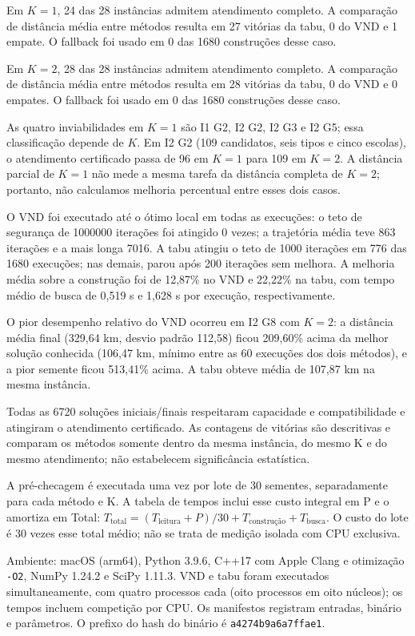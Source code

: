 Em $K=1$, 24 das 28 instâncias admitem atendimento completo. A comparação de distância média entre métodos resulta em 27 vitórias da tabu, 0 do VND e 1 empate. O fallback foi usado em 0 das 1680 construções desse caso.

Em $K=2$, 28 das 28 instâncias admitem atendimento completo. A comparação de distância média entre métodos resulta em 28 vitórias da tabu, 0 do VND e 0 empates. O fallback foi usado em 0 das 1680 construções desse caso.

As quatro inviabilidades em $K=1$ são I1 G2, I2 G2, I2 G3 e I2 G5; essa classificação depende de $K$. Em I2 G2 (109 candidatos, seis tipos e cinco escolas), o atendimento certificado passa de 96 em $K=1$ para 109 em $K=2$. A distância parcial de $K=1$ não mede a mesma tarefa da distância completa de $K=2$; portanto, não calculamos melhoria percentual entre esses dois casos.

O VND foi executado até o ótimo local em todas as execuções: o teto de segurança de 1000000 iterações foi atingido 0 vezes; a trajetória média teve 863 iterações e a mais longa 7016. A tabu atingiu o teto de 1000 iterações em 776 das 1680 execuções; nas demais, parou após 200 iterações sem melhora. A melhoria média sobre a construção foi de 12,87\% no VND e 22,22\% na tabu, com tempo médio de busca de 0,519 s e 1,628 s por execução, respectivamente.

O pior desempenho relativo do VND ocorreu em I2 G8 com $K=2$: a distância média final (329,64 km, desvio padrão 112,58) ficou 209,60\% acima da melhor solução conhecida (106,47 km, mínimo entre as 60 execuções dos dois métodos), e a pior semente ficou 513,41\% acima. A tabu obteve média de 107,87 km na mesma instância.

Todas as 6720 soluções iniciais/finais respeitaram capacidade e compatibilidade e atingiram o atendimento certificado. As contagens de vitórias são descritivas e comparam os métodos somente dentro da mesma instância, do mesmo K e do mesmo atendimento; não estabelecem significância estatística.

A pré-checagem é executada uma vez por lote de 30 sementes, separadamente para cada método e K. A tabela de tempos inclui esse custo integral em P e o amortiza em Total: $T_{\mathrm{total}}=(T_{\mathrm{leitura}}+P)/30+T_{\text{construção}}+T_{\mathrm{busca}}$. O custo do lote é 30 vezes esse total médio; não se trata de medição isolada com CPU exclusiva.

Ambiente: macOS (arm64), Python 3.9.6, C++17 com Apple Clang e otimização \texttt{-O2}, NumPy 1.24.2 e SciPy 1.11.3. VND e tabu foram executados simultaneamente, com quatro processos cada (oito processos em oito núcleos); os tempos incluem competição por CPU. Os manifestos registram entradas, binário e parâmetros. O prefixo do hash do binário é \texttt{a4274b9a6a7ffae1}.
